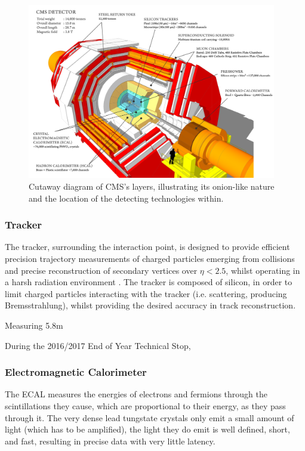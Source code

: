 \begin{figure}[htbp]
\begin{center}
\includegraphics[width=0.97\textwidth]{figs/cms/cms_120918_03.png}
\caption{Cutaway diagram of CMS’s layers, illustrating its onion-like nature and the location of the detecting technologies within.}
\label{fig:cern-accelerator-complex}
\end{center}
\end{figure}


\subsubsection{Tracker}
The tracker, surrounding the interaction point, is designed to provide efficient precision trajectory measurements of charged particles emerging from collisions and precise reconstruction of secondary vertices over $\eta < 2.5$, whilst operating in a harsh radiation environment .
The tracker is composed of silicon, in order to limit charged particles interacting with the tracker (i.e. scattering, producing Bremsstrahlung), whilst providing the desired accuracy in track reconstruction\cite{oldcms}.

Measuring 5.8m 

During the 2016/2017 End of Year Technical Stop, 
\subsubsection{Electromagnetic Calorimeter}
The ECAL measures the energies of electrons and fermions through the scintillations they cause, which are proportional to their energy, as they pass through it.
The very dense lead tungstate crystals only emit a small amount of light (which has to be amplified), the light they do emit is well defined, short, and fast, resulting in precise data with very little latency\cite{oldcms}. 

